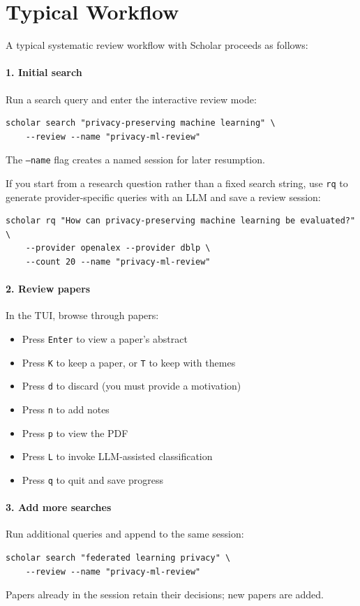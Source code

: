 \section{Typical Workflow}

A typical systematic review workflow with Scholar proceeds as follows:

\paragraph{1. Initial search}
Run a search query and enter the interactive review mode:
\begin{verbatim}
scholar search "privacy-preserving machine learning" \
    --review --name "privacy-ml-review"
\end{verbatim}
The \texttt{--name} flag creates a named session for later resumption.

If you start from a research question rather than a fixed search string, use
\texttt{rq} to generate provider-specific queries with an LLM and save a review
session:
\begin{verbatim}
scholar rq "How can privacy-preserving machine learning be evaluated?" \
    --provider openalex --provider dblp \
    --count 20 --name "privacy-ml-review"
\end{verbatim}

\paragraph{2. Review papers}
In the TUI, browse through papers:
\begin{itemize}
\item Press \texttt{Enter} to view a paper's abstract
\item Press \texttt{K} to keep a paper, or \texttt{T} to keep with themes
\item Press \texttt{d} to discard (you must provide a motivation)
\item Press \texttt{n} to add notes
\item Press \texttt{p} to view the PDF
\item Press \texttt{L} to invoke LLM-assisted classification
\item Press \texttt{q} to quit and save progress
\end{itemize}

\paragraph{3. Add more searches}
Run additional queries and append to the same session:
\begin{verbatim}
scholar search "federated learning privacy" \
    --review --name "privacy-ml-review"
\end{verbatim}
Papers already in the session retain their decisions; new papers are added.


